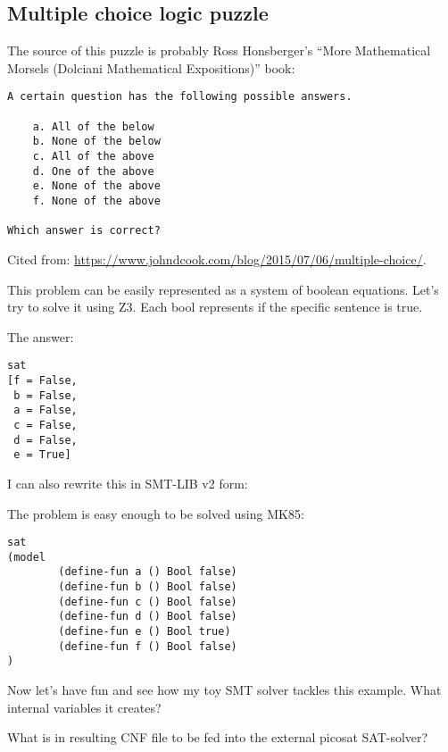 \subsection{Multiple choice logic puzzle}

The source of this puzzle is probably Ross Honsberger's ``More Mathematical Morsels (Dolciani Mathematical Expositions)'' book:

\begin{lstlisting}
A certain question has the following possible answers.

    a. All of the below
    b. None of the below
    c. All of the above
    d. One of the above
    e. None of the above
    f. None of the above

Which answer is correct?
\end{lstlisting}

Cited from: \url{https://www.johndcook.com/blog/2015/07/06/multiple-choice/}.

This problem can be easily represented as a system of boolean equations.
Let's try to solve it using Z3. Each bool represents if the specific sentence is true.



The answer:

\begin{lstlisting}
sat
[f = False,
 b = False,
 a = False,
 c = False,
 d = False,
 e = True]
\end{lstlisting}

I can also rewrite this in SMT-LIB v2 form:



The problem is easy enough to be solved using MK85:

\begin{lstlisting}
sat
(model
        (define-fun a () Bool false)
        (define-fun b () Bool false)
        (define-fun c () Bool false)
        (define-fun d () Bool false)
        (define-fun e () Bool true)
        (define-fun f () Bool false)
)
\end{lstlisting}

Now let's have fun and see how my toy SMT solver tackles this example.
What internal variables it creates?



What is in resulting CNF file to be fed into the external picosat SAT-solver?



